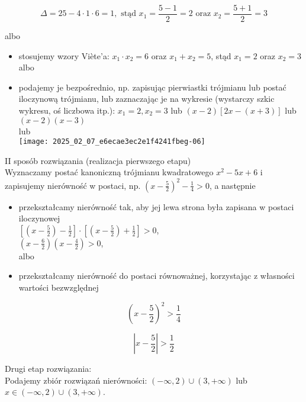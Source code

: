 \documentclass[10pt]{article}
\begin{document}
$$
\Delta=25-4 \cdot 1 \cdot 6=1, \text { stąd } x_{1}=\frac{5-1}{2}=2 \text { oraz } x_{2}=\frac{5+1}{2}=3
$$

albo

\begin{itemize}
  \item stosujemy wzory Viète'a: $x_{1} \cdot x_{2}=6$ oraz $x_{1}+x_{2}=5$, stąd $x_{1}=2$ oraz $x_{2}=3$\\
albo
  \item podajemy je bezpośrednio, np. zapisując pierwiastki trójmianu lub postać iloczynową trójmianu, lub zaznaczając je na wykresie (wystarczy szkic wykresu, oś liczbowa itp.): $x_{1}=2, x_{2}=3$ lub $(x-2)[2 x-(x+3)]$ lub $(x-2)(x-3)$\\
lub\\
\texttt{[image: 2025\_02\_07\_e6ecae3ec2e1f4241fbeg-06]}
\end{itemize}

II sposób rozwiązania (realizacja pierwszego etapu)\\
Wyznaczamy postać kanoniczną trójmianu kwadratowego $x^{2}-5 x+6$ i zapisujemy nierówność w postaci, np. $\left(x-\frac{5}{2}\right)^{2}-\frac{1}{4}>0$, a następnie

\begin{itemize}
  \item przekształcamy nierówność tak, aby jej lewa strona była zapisana w postaci iloczynowej\\
$\left[\left(x-\frac{5}{2}\right)-\frac{1}{2}\right] \cdot\left[\left(x-\frac{5}{2}\right)+\frac{1}{2}\right]>0$,\\
$\left(x-\frac{6}{2}\right)\left(x-\frac{4}{2}\right)>0$,\\
albo
  \item przekształcamy nierówność do postaci równoważnej, korzystając z własności wartości bezwzględnej
\end{itemize}

$$
\left(x-\frac{5}{2}\right)^{2}>\frac{1}{4}
$$

$$
\left|x-\frac{5}{2}\right|>\frac{1}{2}
$$

Drugi etap rozwiązania:\\
Podajemy zbiór rozwiązań nierówności: $(-\infty, 2) \cup(3,+\infty)$ lub $x \in(-\infty, 2) \cup(3,+\infty)$.
\end{document}
